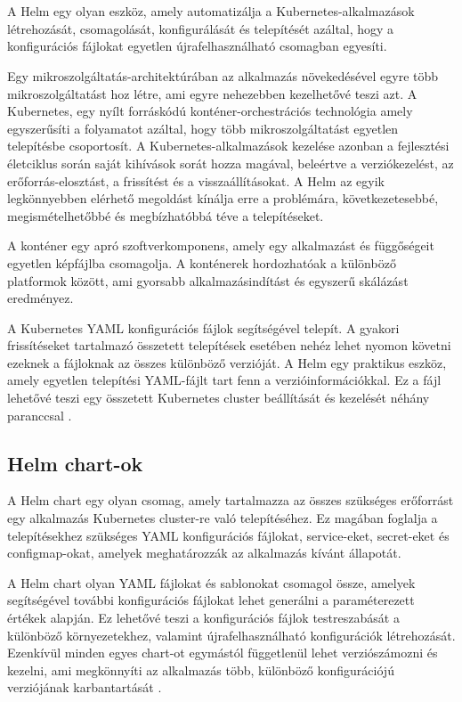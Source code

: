 \chapter{\helm}
A Helm egy olyan eszköz, amely automatizálja a Kubernetes-alkalmazások létrehozását, csomagolását, konfigurálását és telepítését azáltal, hogy a konfigurációs fájlokat egyetlen újrafelhasználható csomagban egyesíti.

Egy mikroszolgáltatás-architektúrában az alkalmazás növekedésével egyre több mikroszolgáltatást hoz létre, ami egyre nehezebben kezelhetővé teszi azt.
A Kubernetes, egy nyílt forráskódú konténer-orchestrációs technológia amely egyszerűsíti a folyamatot azáltal, hogy több mikroszolgáltatást egyetlen telepítésbe csoportosít.
A Kubernetes-alkalmazások kezelése azonban a fejlesztési életciklus során saját kihívások sorát hozza magával, beleértve a verziókezelést, az erőforrás-elosztást, a frissítést és a visszaállításokat.
A Helm az egyik legkönnyebben elérhető megoldást kínálja erre a problémára, következetesebbé, megismételhetőbbé és megbízhatóbbá téve a telepítéseket.

A konténer egy apró szoftverkomponens, amely egy alkalmazást és függőségeit egyetlen képfájlba csomagolja.
A konténerek hordozhatóak a különböző platformok között, ami gyorsabb alkalmazásindítást és egyszerű skálázást eredményez.

A Kubernetes YAML konfigurációs fájlok segítségével telepít.
A gyakori frissítéseket tartalmazó összetett telepítések esetében nehéz lehet nyomon követni ezeknek a fájloknak az összes különböző verzióját.
A Helm egy praktikus eszköz, amely egyetlen telepítési YAML-fájlt tart fenn a verzióinformációkkal.
Ez a fájl lehetővé teszi egy összetett Kubernetes cluster beállítását és kezelését néhány paranccsal \cite{helm}.

\section{Helm chart-ok}
A Helm chart egy olyan csomag, amely tartalmazza az összes szükséges erőforrást egy alkalmazás Kubernetes cluster-re való telepítéséhez.
Ez magában foglalja a telepítésekhez szükséges YAML konfigurációs fájlokat, service-eket, secret-eket és configmap-okat, amelyek meghatározzák az alkalmazás kívánt állapotát.

A Helm chart olyan YAML fájlokat és sablonokat csomagol össze, amelyek segítségével további konfigurációs fájlokat lehet generálni a paraméterezett értékek alapján.
Ez lehetővé teszi a konfigurációs fájlok testreszabását a különböző környezetekhez, valamint újrafelhasználható konfigurációk létrehozását.
Ezenkívül minden egyes chart-ot egymástól függetlenül lehet verziószámozni és kezelni, ami megkönnyíti az alkalmazás több, különböző konfigurációjú verziójának karbantartását \cite{helm}.

